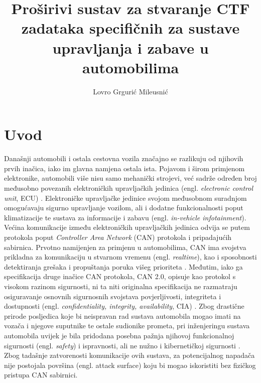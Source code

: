 \documentclass[times, utf8, diplomski, numeric]{fer}
\begin{document}

\title{Proširivi sustav za stvaranje CTF zadataka specifičnih za sustave upravljanja i
zabave u automobilima}

\author{Lovro Grgurić Mileusnić}

\maketitle

\izvornik

\zahvala{}

\tableofcontents

\chapter{Uvod}
Današnji automobili i ostala cestovna vozila značajno se razlikuju od njihovih prvih inačica, iako im glavna namjena ostala ista. Pojavom i širom primjenom elektronike, automobili više nisu samo mehanički strojevi, već sadrže određen broj međusobno povezanih elektroničkih upravljačkih jedinica (engl. \textit{electronic control unit}, ECU) \cite{koscher2010}. Elektroničke upravljačke jedinice svojom međusobnom suradnjom omogućavaju sigurno upravljanje vozilom, ali i dodatne funkcionalnosti poput klimatizacije te sustava za informacije i zabavu (engl. \textit{in-vehicle infotainment}). Većina komunikacije između elektroničkih upravljačkih jedinica odvija se putem protokola poput \textit{Controller Area Network} (CAN) protokola i pripadajućih sabirnica. Prvotno namijenjen za primjenu u automobilima, CAN ima svojstva prikladna za komunikaciju u stvarnom vremenu (engl. \textit{realtime}), kao i sposobnosti detektiranja grešaka i propuštanja poruka višeg prioriteta \cite{canopen1}. Međutim, iako ga specifikacija druge inačice CAN protokola, CAN 2.0, opisuje kao protokol s visokom razinom sigurnosti, ni ta niti originalna specifikacija ne razmatraju osiguravanje osnovnih sigurnosnih svojstava povjerljivosti, integriteta i dostupnosti (engl. \textit{confidentiality, integrity, availability}, CIA) \cite{bosch1991, canislabs1}. Zbog drastične prirode posljedica koje bi neispravan rad sustava automobila mogao imati na vozača i njegove suputnike te ostale sudionike prometa, pri inženjeringu sustava automobila uvijek je bila pridodana posebna pažnja njihovoj funkcionalnoj sigurnosti (engl. \textit{safety}) i ispravnosti, ali ne nužno i kibernetičkoj sigurnosti \cite{koscher2010}. Zbog tadašnje zatvorenosti komunikacije ovih sustava, za potencijalnog napadača nije postojala površina (engl. attack surface) koju bi mogao iskoristiti bez fizičkog pristupa CAN sabirnici.
\end{document}
